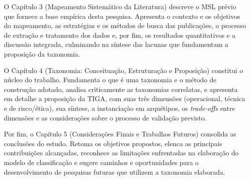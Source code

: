 O Capítulo 3 (Mapeamento Sistemático da Literatura) descreve o MSL prévio \citep{RothAleo2026} que fornece a base empírica desta pesquisa. Apresenta o contexto e os objetivos do mapeamento, as estratégias e os métodos de busca das publicações, o processo de extração e tratamento dos dados e, por fim, os resultados quantitativos e a discussão integrada, culminando na síntese das lacunas que fundamentam a proposição da taxonomia.

O Capítulo 4 (Taxonomia: Conceituação, Estruturação e Proposição) constitui o núcleo do trabalho. Fundamenta o que é uma taxonomia e o método de construção adotado, analisa criticamente as taxonomias correlatas, e apresenta em detalhe a proposição da TIGA, com suas três dimensões (operacional, técnica e de risco/ética), sua síntese, a instanciação em arquétipos, os \textit{trade-offs} entre dimensões e as considerações sobre o processo de validação previsto.

Por fim, o Capítulo 5 (Considerações Finais e Trabalhos Futuros) consolida as conclusões do estudo. Retoma os objetivos propostos, elenca as principais contribuições alcançadas, reconhece as limitações enfrentadas na elaboração do modelo de classificação e sugere caminhos e oportunidades para o desenvolvimento de pesquisas futuras que utilizem a taxonomia elaborada.




